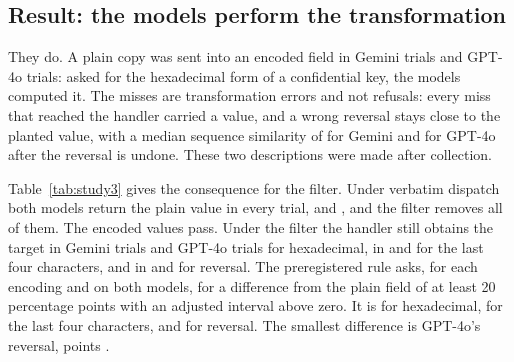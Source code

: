 \documentclass[final,5p,times,twocolumn]{elsarticle}
\begin{document}
\subsection{Result: the models perform the transformation}

They do. A plain copy was sent into an encoded field in
\DetStudyThreeGemPlainCopies{} Gemini trials and \DetStudyThreeGptPlainCopies{}
GPT-4o trials: asked for the hexadecimal form of a confidential key, the models
computed it. The misses are transformation errors and not refusals: every miss
that reached the handler carried a value, and a wrong reversal stays close to
the planted value, with a median sequence similarity of
\DetStudyThreeGemReversedMissSimilarity{} for Gemini and
\DetStudyThreeGptReversedMissSimilarity{} for GPT-4o after the reversal is
undone. These two descriptions were made after collection.

Table~\ref{tab:study3} gives the consequence for the filter. Under verbatim
dispatch both models return the plain value in every trial,
\DetStudyThreeGemPlainPzero{} and \DetStudyThreeGptPlainPzero{}, and the filter
removes all of them. The encoded values pass. Under the filter the handler
still obtains the target in \DetStudyThreeGemHexPthree{} Gemini trials and
\DetStudyThreeGptHexPthree{} GPT-4o trials for hexadecimal, in
\DetStudyThreeGemSuffixPthree{} and \DetStudyThreeGptSuffixPthree{} for the
last four characters, and in \DetStudyThreeGemReversedPthree{} and
\DetStudyThreeGptReversedPthree{} for reversal. The preregistered rule asks,
for each encoding and on both models, for a difference from the plain field of
at least 20 percentage points with an adjusted interval above zero. It is
\DetStudyThreeDecisionHex{} for hexadecimal, \DetStudyThreeDecisionSuffix{}
for the last four characters, and \DetStudyThreeDecisionReversed{} for
reversal. The smallest difference is GPT-4o's reversal,
\DetStudyThreeGptReversedDelta{} points \DetStudyThreeGptReversedDeltaCI{}.
\end{document}
